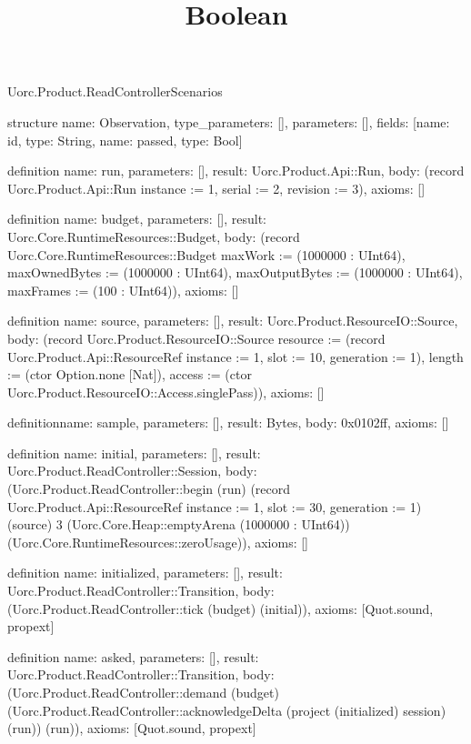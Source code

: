 \begin{lexlean}{Uorc.Product.ReadControllerScenarios}
\title{Boolean}
\begin{semanticmodule}
structure{
  name: Observation,
  type_parameters: [],
  parameters: [],
  fields: [{name: id, type: String}, {name: passed, type: Bool}]
}

definition{
  name: run,
  parameters: [],
  result: Uorc.Product.Api::Run,
  body: (record Uorc.Product.Api::Run {instance := 1, serial := 2, revision := 3}),
  axioms: []
}

definition{
  name: budget,
  parameters: [],
  result: Uorc.Core.RuntimeResources::Budget,
  body: (record Uorc.Core.RuntimeResources::Budget {maxWork := (1000000 : UInt64), maxOwnedBytes := (1000000 : UInt64), maxOutputBytes := (1000000 : UInt64), maxFrames := (100 : UInt64)}),
  axioms: []
}

definition{
  name: source,
  parameters: [],
  result: Uorc.Product.ResourceIO::Source,
  body: (record Uorc.Product.ResourceIO::Source {resource := (record Uorc.Product.Api::ResourceRef {instance := 1, slot := 10, generation := 1}), length := (ctor Option.none [Nat]), access := (ctor Uorc.Product.ResourceIO::Access.singlePass)}),
  axioms: []
}

definition{name: sample, parameters: [], result: Bytes, body: 0x0102ff, axioms: []}

definition{
  name: initial,
  parameters: [],
  result: Uorc.Product.ReadController::Session,
  body: (Uorc.Product.ReadController::begin (run) (record Uorc.Product.Api::ResourceRef {instance := 1, slot := 30, generation := 1}) (source) 3 (Uorc.Core.Heap::emptyArena (1000000 : UInt64)) (Uorc.Core.RuntimeResources::zeroUsage)),
  axioms: []
}

definition{
  name: initialized,
  parameters: [],
  result: Uorc.Product.ReadController::Transition,
  body: (Uorc.Product.ReadController::tick (budget) (initial)),
  axioms: [Quot.sound, propext]
}

definition{
  name: asked,
  parameters: [],
  result: Uorc.Product.ReadController::Transition,
  body: (Uorc.Product.ReadController::demand (budget) (Uorc.Product.ReadController::acknowledgeDelta (project (initialized) session) (run)) (run)),
  axioms: [Quot.sound, propext]
}


\end{semanticmodule}
\end{lexlean}
